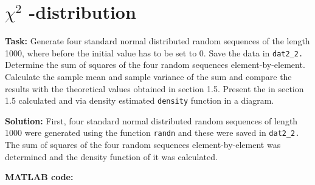 \section{$\chi^2$ -distribution } 
\noindent \textbf{Task:} Generate four standard normal distributed random sequences of the length 1000, where before the initial value has to be set to 0. Save the data in \texttt{dat2\_2.} Determine the sum of squares of the
four random sequences element-by-element. Calculate the sample mean and sample variance of
the sum and compare the results with the theoretical values obtained in section 1.5. Present the
in section 1.5 calculated and via density estimated \texttt{density} function in a diagram. 
 
 \noindent \textbf{Solution:} First, four standard normal distributed random sequences of length 1000 were generated using the function \texttt{randn} and these were saved in \texttt{dat2\_2.} The sum of squares of the four random sequences element-by-element was determined and the density function of it was calculated.
  
 \noindent \textbf{MATLAB code:}


